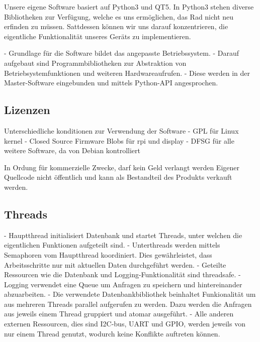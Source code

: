 Unsere eigene Software basiert auf  Python3 und QT5. In Python3 stehen diverse
Bibliotheken   zur  Verf\"ugung,  welche  es uns  erm\"oglichen,
das  Rad  nicht   neu  erfinden  zu  m\"ussen. Sattdessen   k\"onnen  wir  uns
darauf  konzentrieren, die  eigentliche Funktionalit\"at  unseres Ger\"ats  zu
implementieren.



 - Grundlage für die Software bildet das angepasste Betriebssystem.
 - Darauf aufgebaut sind Programmbibliotheken zur Abstraktion von Betriebsystemfunktionen und weiteren Hardwareaufrufen.
 - Diese werden in der Master-Software eingebunden und mittels Python-API angesprochen.


\subsection{Lizenzen}
\label{subsec:software:master:licenses}

Unterschiedliche konditionen zur Verwendung der Software
 - GPL für Linux kernel
 - Closed Source Firmware Blobs für rpi und display
 - DFSG für alle weitere Software, da von Debian kontrolliert

In Ordung für kommerzielle Zwecke, darf kein Geld verlangt werden
Eigener Quellcode nicht öffentlich und kann als Bestandteil des Produkts verkauft werden.


\subsection{Threads}
\label{subsec:software:master:threads}

 - Hauptthread initialisiert Datenbank und startet Threads, unter welchen die eigentlichen Funktionen aufgeteilt sind.
 - Unterthreads werden mittels Semaphoren vom Hauptthread koordiniert. Dies gewährleistet, dass Arbeitsschritte nur mit aktuellen Daten durchgeführt werden.
 - Geteilte Ressourcen wie die Datenbank und Logging-Funktionalität sind threadsafe.
    - Logging verwendet eine Queue um Anfragen zu speichern und hintereinander abzuarbeiten.
    - Die verwendete Datenbankbibliothek beinhaltet Funkionalität um aus mehreren Threads parallel aufgerufen zu werden. Dazu werden die Anfragen aus jeweils einem Thread gruppiert und atomar ausgeführt.
 - Alle anderen externen Ressourcen, dies sind I2C-bus, UART und GPIO, werden jeweils von nur einem Thread genutzt, wodurch keine Konflikte auftreten können.


